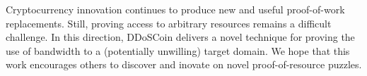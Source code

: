 Cryptocurrency innovation continues to produce new and useful proof-of-work
replacements. Still, proving access to arbitrary resources remains a difficult
challenge. In this direction, DDoSCoin delivers a novel technique for proving
the use of bandwidth to a (potentially unwilling) target domain. We hope that
this work encourages others to discover and inovate on novel proof-of-resource
puzzles.

{\footnotesize\balance

}


